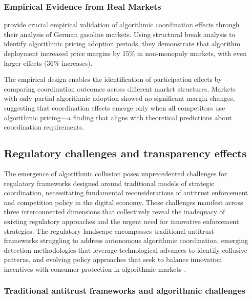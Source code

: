 \subsubsection*{Empirical Evidence from Real Markets}

\textcite{assad_algorithmic_2024} provide crucial empirical validation of algorithmic coordination effects through their analysis of German gasoline markets. Using structural break analysis to identify algorithmic pricing adoption periods, they demonstrate that algorithm deployment increased price margins by 15\% in non-monopoly markets, with even larger effects (36\% increases).

The empirical design enables the identification of participation effects by comparing coordination outcomes across different market structures. Markets with only partial algorithmic adoption showed no significant margin changes, suggesting that coordination effects emerge only when all competitors use algorithmic pricing---a finding that aligns with theoretical predictions about coordination requirements.

\subsection{Regulatory challenges and transparency effects}

The emergence of algorithmic collusion poses unprecedented challenges for regulatory frameworks designed around traditional models of strategic coordination, necessitating fundamental reconsiderations of antitrust enforcement and competition policy in the digital economy. These challenges manifest across three interconnected dimensions that collectively reveal the inadequacy of existing regulatory approaches and the urgent need for innovative enforcement strategies. The regulatory landscape encompasses traditional antitrust frameworks struggling to address autonomous algorithmic coordination, emerging detection methodologies that leverage technological advances to identify collusive patterns, and evolving policy approaches that seek to balance innovation incentives with consumer protection in algorithmic markets \parencite{ezrachi_sustainable_2020, oecd_algorithmic_2023, harrington_developing_2018}.

\subsubsection*{Traditional antitrust frameworks and algorithmic challenges}

